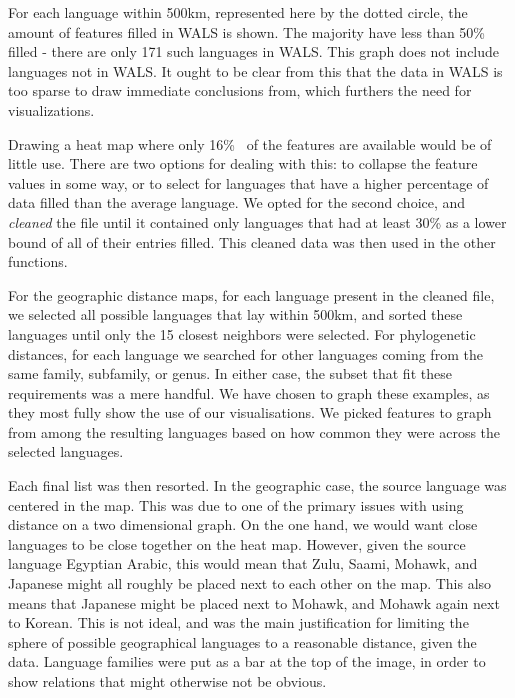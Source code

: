\documentclass[11pt]{article}
\begin{document}
For each language within 500km, represented here by the dotted circle, the amount of features filled in WALS is shown. The majority have less than 50\% filled - there are only 171 such languages in WALS. This graph does not include languages not in WALS. It ought to be clear from this that the data in WALS is too sparse to draw immediate conclusions from, which furthers the need for visualizations. 

Drawing a heat map where only 16\%~ of the features are available would be of little use. There are two options for dealing with this: to collapse the feature values in some way, or to select for languages that have a higher percentage of data filled than the average language. We opted for the second choice, and \emph{cleaned}  the file until it contained only languages that had at least 30\% as a lower bound of all of their entries filled. This cleaned data was then used in the other functions.  

For the geographic distance maps, for each language present in the cleaned file, we selected all possible languages that lay within 500km, and sorted these languages until only the 15 closest neighbors were selected. For phylogenetic distances, for each language we searched for other languages coming from the same family, subfamily, or genus. In either case, the subset that fit these requirements was a mere handful. We have chosen to graph these examples, as they most fully show the use of our visualisations. We picked features to graph from among the resulting languages based on how common they were across the selected languages. 


Each final list was then resorted. In the geographic case, the source language was centered in the map. This was due to one of the primary issues with using distance on a two dimensional graph. On the one hand, we would want close languages to be close together on the heat map. However, given the source language Egyptian Arabic, this would mean that Zulu, Saami, Mohawk, and Japanese might all roughly be placed next to each other on the map. This also means that Japanese might be placed next to Mohawk, and Mohawk again next to Korean. This is not ideal, and was the main justification for limiting the sphere of possible geographical languages to a reasonable distance, given the data. Language families were put as a bar at the top of the image, in order to show relations that might otherwise not be obvious.
\end{document}
